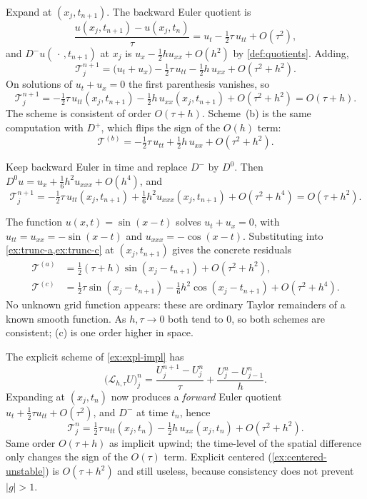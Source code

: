 \documentclass[11pt,a4paper]{article}
\begin{document}
\begin{example}
\label{ex:trunc-a}
Expand at \((x_j,t_{n+1})\). The backward Euler quotient is
\[
\frac{u(x_j,t_{n+1})-u(x_j,t_n)}{\tau}
=
u_t
-
\tfrac12\tau\,u_{tt}
+
O(\tau^2),
\]
and \(D^-u(\,\cdot\,,t_{n+1})\) at \(x_j\) is \(u_x-\tfrac12 h u_{xx}+O(h^2)\) by \cref{def:quotients}. Adding,
\[
\mathcal T_j^{n+1}
=
\bigl(u_t+u_x\bigr)
-
\tfrac12\tau\,u_{tt}
-
\tfrac12 h\,u_{xx}
+
O(\tau^2+h^2).
\]
On solutions of \(u_t+u_x=0\) the first parenthesis vanishes, so
\[
\mathcal T_j^{n+1}
=
-\tfrac12\tau\,u_{tt}(x_j,t_{n+1})
-
\tfrac12 h\,u_{xx}(x_j,t_{n+1})
+
O(\tau^2+h^2)
=
O(\tau+h).
\]
The scheme is consistent of order \(O(\tau+h)\). Scheme~(b) is the same computation with \(D^+\), which flips the sign of the \(O(h)\) term:
\[
\mathcal T^{(b)}
=
-\tfrac12\tau\,u_{tt}
+
\tfrac12 h\,u_{xx}
+
O(\tau^2+h^2).
\]
\end{example}

\begin{example}
\label{ex:trunc-c}
Keep backward Euler in time and replace \(D^-\) by \(D^0\). Then \(D^0u=u_x+\tfrac16 h^2 u_{xxx}+O(h^4)\), and
\[
\mathcal T_j^{n+1}
=
-\tfrac12\tau\,u_{tt}(x_j,t_{n+1})
+
\tfrac16 h^2 u_{xxx}(x_j,t_{n+1})
+
O(\tau^2+h^4)
=
O(\tau+h^2).
\]
\end{example}

\begin{example}
\label{ex:trunc-sine}
The function \(u(x,t)=\sin(x-t)\) solves \(u_t+u_x=0\), with \(u_{tt}=u_{xx}=-\sin(x-t)\) and \(u_{xxx}=-\cos(x-t)\). Substituting into \cref{ex:trunc-a,ex:trunc-c} at \((x_j,t_{n+1})\) gives the concrete residuals
\begin{align*}
\mathcal T^{(a)}
&=
\tfrac12(\tau+h)\sin(x_j-t_{n+1})+O(\tau^2+h^2),
\\
\mathcal T^{(c)}
&=
\tfrac12\tau\sin(x_j-t_{n+1})
-
\tfrac16 h^2\cos(x_j-t_{n+1})
+O(\tau^2+h^4).
\end{align*}
No unknown grid function appears: these are ordinary Taylor remainders of a known smooth function. As \(h,\tau\to 0\) both tend to \(0\), so both schemes are consistent; (c) is one order higher in space.
\end{example}

\begin{example}
\label{ex:trunc-expl-upwind}
The explicit scheme of \cref{ex:expl-impl} has
\[
\bigl(\mathcal L_{h,\tau}U\bigr)_j^n
=
\frac{U_j^{n+1}-U_j^n}{\tau}
+
\frac{U_j^n-U_{j-1}^n}{h}.
\]
Expanding at \((x_j,t_n)\) now produces a \emph{forward} Euler quotient \(u_t+\tfrac12\tau u_{tt}+O(\tau^2)\), and \(D^-\) at time \(t_n\), hence
\[
\mathcal T_j^n
=
\tfrac12\tau\,u_{tt}(x_j,t_n)
-
\tfrac12 h\,u_{xx}(x_j,t_n)
+
O(\tau^2+h^2).
\]
Same order \(O(\tau+h)\) as implicit upwind; the time-level of the spatial difference only changes the sign of the \(O(\tau)\) term. Explicit centered (\cref{ex:centered-unstable}) is \(O(\tau+h^2)\) and still useless, because consistency does not prevent \(|g|>1\).
\end{example}
\end{document}

